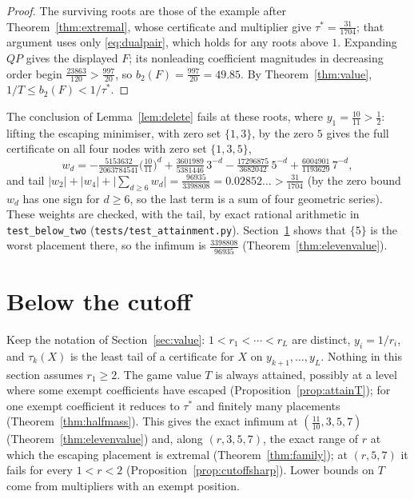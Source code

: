 \documentclass[11pt]{article}
\theoremstyle{definition}
\theoremstyle{plain}
\begin{document}
\begin{proof}
The surviving roots are those of the example after
Theorem~\ref{thm:extremal}, whose certificate and multiplier give
$\tau^*=\tfrac{31}{1704}$; that argument uses only \eqref{eq:dualpair},
which holds for any roots above $1$.  Expanding $QP$ gives the displayed
$F$; its nonleading coefficient magnitudes in decreasing order begin
$\tfrac{23863}{120}>\tfrac{997}{20}$, so $b_2(F)=\tfrac{997}{20}=49.85$.  By
Theorem~\ref{thm:value}, $1/T\le b_2(F)<1/\tau^*$.
\end{proof}

The conclusion of Lemma~\ref{lem:delete} fails at these roots, where
$y_1=\tfrac{10}{11}>\tfrac12$:
lifting the escaping minimiser, with zero set $\{1,3\}$, by the zero $5$
gives the full certificate on all four nodes with zero set $\{1,3,5\}$,
\[
  w_d=-\tfrac{5153632}{2063784541}\bigl(\tfrac{10}{11}\bigr)^d
  +\tfrac{3601989}{5381446}\,3^{-d}
  -\tfrac{17296875}{3682042}\,5^{-d}
  +\tfrac{6004901}{1193629}\,7^{-d},
\]
and tail $|w_2|+|w_4|+\bigl|\sum_{d\ge6}w_d\bigr|
=\tfrac{96935}{3398808}=0.02852\ldots>\tfrac{31}{1704}$ (by the zero bound
$w_d$ has one sign for $d\ge6$, so the last term is a sum of four
geometric series).  These weights are checked, with the tail, by exact
rational arithmetic in \texttt{test\_below\_two}
(\texttt{tests/test\_attainment.py}).
Section~\ref{sec:belowtwo} shows that $\{5\}$ is the worst placement there,
so the infimum is $\tfrac{3398808}{96935}$ (Theorem~\ref{thm:elevenvalue}).

\section{Below the cutoff}\label{sec:belowtwo}

Keep the notation of Section~\ref{sec:value}: $1<r_1<\cdots<r_L$ are
distinct, $y_i=1/r_i$, and $\tau_k(X)$ is the least tail of a certificate
for $X$ on $y_{k+1},\ldots,y_L$.  Nothing in this section assumes
$r_1\ge2$.  The game value $T$ is always attained, possibly at a level
where some exempt coefficients have escaped
(Proposition~\ref{prop:attainT}); for one exempt coefficient it reduces to
$\tau^*$ and finitely many placements (Theorem~\ref{thm:halfmass}).  This
gives the exact infimum at $(\tfrac{11}{10},3,5,7)$
(Theorem~\ref{thm:elevenvalue}) and, along $(r,3,5,7)$, the exact range of
$r$ at which the escaping placement is extremal
(Theorem~\ref{thm:family}); at $(r,5,7)$ it fails for every $1<r<2$
(Proposition~\ref{prop:cutoffsharp}).  Lower bounds on $T$ come from
multipliers with an exempt position.
\end{document}
